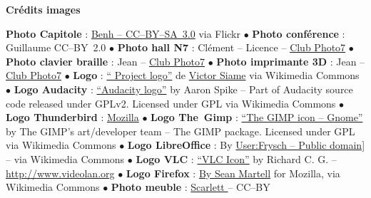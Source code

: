 
\vfill
\begin{center}
\textcolor{Cdl}{\textbf{Crédits images}} \par
{\tiny
 \textbf{Photo Capitole} : \href{https://www.flickr.com/photos/blieusong/6986608500/in/set-72157629942158013}{Benh  -- CC--BY--SA~3.0} via Flickr  \textcolor{Cdl}{$\bullet$}
 \textbf{Photo conférence } : Guillaume  CC--BY~2.0 \textcolor{Cdl}{$\bullet$}
 \textbf{Photo hall N7} : Clément  -- Licence  -- \href{http://www.bde.enseeiht.fr/clubs/photo/}{Club Photo7} \textcolor{Cdl}{$\bullet$}
 \textbf{Photo clavier braille} : Jean  -- \href{http://www.bde.enseeiht.fr/clubs/photo/}{Club Photo7} \textcolor{Cdl}{$\bullet$}
 \textbf{Photo imprimante 3D} : Jean  -- \href{http://www.bde.enseeiht.fr/clubs/photo/}{Club Photo7} \textcolor{Cdl}{$\bullet$}
 \textbf{Logo } : \href{https://commons.wikimedia.org/wiki/File\%3AOfficial_gnu.svg}{“ Project logo”} de \href{mailto:vcopovi@wanadoo.fr}{Victor Siame} via Wikimedia Commons \textcolor{Cdl}{$\bullet$}
 \textbf{Logo Audacity} : \href{https://commons.wikimedia.org/wiki/File:Audacity_Logo.svg#/media/File:Audacity_Logo.svg}{“Audacity logo”} by Aaron Spike -- Part of Audacity source code released under GPLv2. Licensed under GPL via Wikimedia Commons \textcolor{Cdl}{$\bullet$}
 \textbf{Logo Thunderbird} : \href{}{Mozilla} \textcolor{Cdl}{$\bullet$}
 \textbf{Logo The~Gimp} : \href{https://commons.wikimedia.org/wiki/File:The_GIMP_icon_-_gnome.svg#/media/File:The_GIMP_icon_-_gnome.svg}{“The GIMP icon -- Gnome”} by The GIMP's art/developer team -- The GIMP package. Licensed under GPL via Wikimedia Commons \textcolor{Cdl}{$\bullet$}
 \textbf{Logo LibreOffice} : By \href{https://commons.wikimedia.org/wiki/File\%3ALogo-libreoffice.svg}{User:Frysch -- Public domain]} -- via Wikimedia Commons \textcolor{Cdl}{$\bullet$}
 \textbf{Logo VLC} : \href{https://commons.wikimedia.org/wiki/File:VLC_Icon.svg#/media/File:VLC_Icon.svg}{“VLC Icon”} by Richard C. G.  -- \url{http://www.videolan.org} \textcolor{Cdl}{$\bullet$}
 \textbf{Logo Firefox} : \href{https://commons.wikimedia.org/wiki/File\%3AMozilla_Firefox_logo_2013.svg}{By Sean Martell} for Mozilla, via Wikimedia Commons \textcolor{Cdl}{$\bullet$}
 \textbf{Photo meuble} : \href{https://www.opendesk.cc/fin/fin-lockers}{Scarlett } -- CC--BY

}
\end{center}
